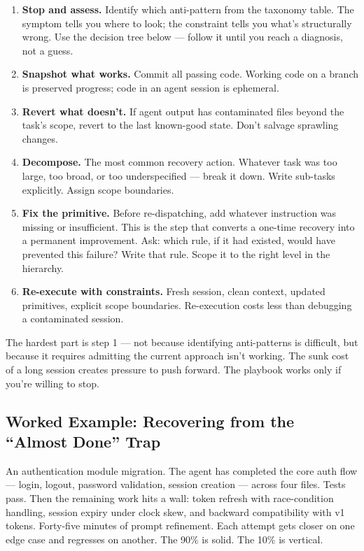 \documentclass[
  a4paper,
  DIV=11,
  numbers=noendperiod]{scrreprt}
\begin{document}
\begin{enumerate}
\def\labelenumi{\arabic{enumi}.}
\item
  \textbf{Stop and assess.} Identify which anti-pattern from the
  taxonomy table. The symptom tells you where to look; the constraint
  tells you what's structurally wrong. Use the decision tree below ---
  follow it until you reach a diagnosis, not a guess.
\item
  \textbf{Snapshot what works.} Commit all passing code. Working code on
  a branch is preserved progress; code in an agent session is ephemeral.
\item
  \textbf{Revert what doesn't.} If agent output has contaminated files
  beyond the task's scope, revert to the last known-good state. Don't
  salvage sprawling changes.
\item
  \textbf{Decompose.} The most common recovery action. Whatever task was
  too large, too broad, or too underspecified --- break it down. Write
  sub-tasks explicitly. Assign scope boundaries.
\item
  \textbf{Fix the primitive.} Before re-dispatching, add whatever
  instruction was missing or insufficient. This is the step that
  converts a one-time recovery into a permanent improvement. Ask: which
  rule, if it had existed, would have prevented this failure? Write that
  rule. Scope it to the right level in the hierarchy.
\item
  \textbf{Re-execute with constraints.} Fresh session, clean context,
  updated primitives, explicit scope boundaries. Re-execution costs less
  than debugging a contaminated session.
\end{enumerate}

The hardest part is step 1 --- not because identifying anti-patterns is
difficult, but because it requires admitting the current approach isn't
working. The sunk cost of a long session creates pressure to push
forward. The playbook works only if you're willing to stop.

\subsection{Worked Example: Recovering from the ``Almost Done''
Trap}\label{worked-example-recovering-from-the-almost-done-trap}

An authentication module migration. The agent has completed the core
auth flow --- login, logout, password validation, session creation ---
across four files. Tests pass. Then the remaining work hits a wall:
token refresh with race-condition handling, session expiry under clock
skew, and backward compatibility with v1 tokens. Forty-five minutes of
prompt refinement. Each attempt gets closer on one edge case and
regresses on another. The 90\% is solid. The 10\% is vertical.
\end{document}
